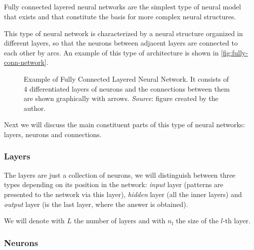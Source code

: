\subsection{}\label{sec:fnn}

Fully connected layered neural networks are the simplest type of neural model
that exists and that constitute the basis for more complex neural structures.

This type of neural network is characterized by a neural structure organized in
different layers, so that the neurons between adjacent layers are connected to
each other by arcs. An example of this type of architecture is shown in
\vref{fig:fully-conn-network}.

\begin{figure}[ht]
  \centering
  
  \caption[Fully Connected Neural Network topology]{Example of Fully Connected
    Layered Neural Network. It consists of 4 differentiated layers of neurons
    and the connections between them are shown graphically with
    arrows. \textsl{Source}: figure created by the
    author.}\label{fig:fully-conn-network}
\end{figure}

Next we will discuss the main constituent parts of this type of neural
networks: layers, neurons and connections.

\subsubsection{Layers}

The layers are just a collection of neurons, we will distinguish between three
types depending on its position in the network: \emph{input} layer (patterns
are presented to the network via this layer), \emph{hidden} layer (all the
inner layers) and \emph{output} layer (is the last layer, where the answer is
obtained).

We will denote with \(L\) the number of layers and with \(n_l\) the size of the
\(l\)-th layer.

\subsubsection{Neurons}

